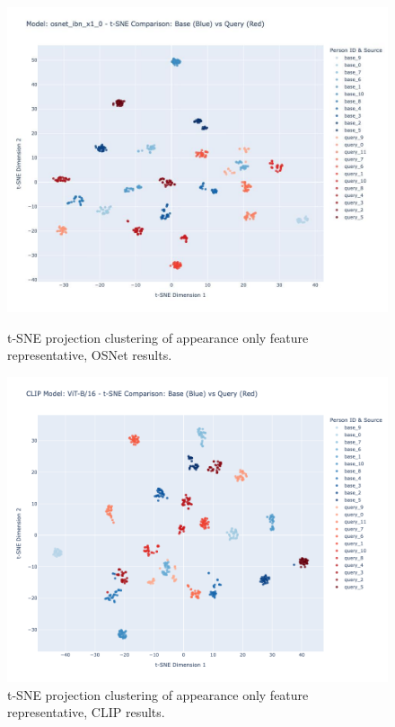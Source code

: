 \documentclass[12pt, a4paper]{article}
\begin{document}
\begin{figure}[h]
    \centering
    \begin{minipage}{0.4\textwidth}
        \centering
        \includegraphics[width=\linewidth]{pictures/tsne_osnet.jpeg}
        \caption{t-SNE projection clustering of appearance only feature representative, OSNet results.}
        \label{fig:tsne_osnet}
    \end{minipage}
    \begin{minipage}{0.4\textwidth}
        \centering
        \includegraphics[width=\linewidth]{pictures/tsne_clip.png}
        \caption{t-SNE projection clustering of appearance only feature representative, CLIP results.}
        \label{fig:tsne_clip}
    \end{minipage}
\end{figure}
\end{document}
